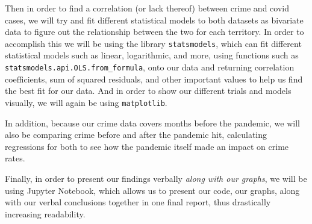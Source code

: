 \documentclass[fontsize=11pt]{article}
\begin{document}
Then in order to find a correlation (or lack thereof) between crime and covid cases, we will try and fit different statistical models to both datasets as bivariate data to figure out the relationship between the two for each territory. In order to accomplish this we will be using the library \verb+statsmodels+, which can fit different statistical models such as linear, logarithmic, and more, using functions such as  \verb+statsmodels.api.OLS.from_formula+, onto our data and returning correlation coefficients, sum of squared residuals, and other important values to help us find the best fit for our data. And in order to show our different trials and models visually, we will again be using \verb+matplotlib+.

In addition, because our crime data covers months before the pandemic, we will also be comparing crime before and after the pandemic hit, calculating regressions for both to see how the pandemic itself made an impact on crime rates.

Finally, in order to present our findings verbally \emph{along with our graphs}, we will be using Jupyter Notebook, which allows us to present our code, our graphs, along with our verbal conclusions together in one final report, thus drastically increasing readability.
\end{document}
